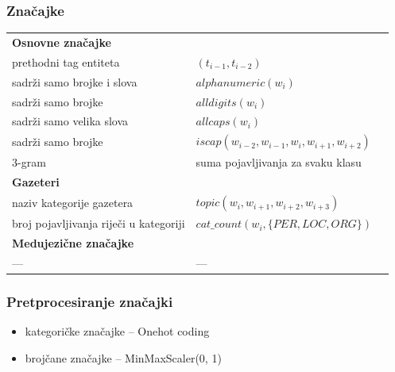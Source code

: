 \documentclass{beamer}
\begin{document}
\begin{frame}
\frametitle{Značajke}
\begin{center}
\begin{tabular}{llr}
\hline
\textbf{Osnovne značajke} & \\
prethodni tag entiteta & $ (t_{i-1},t_{i-2}) $\\ 
sadrži samo brojke i slova & $ alphanumeric(w_i) $\\ 
sadrži samo brojke  & $ alldigits(w_i) $\\ 
sadrži samo velika slova & $ allcaps(w_i) $\\ 
sadrži samo brojke & $ iscap(w_{i-2}, w_{i-1}, w_{i}, w_{i+1}, w_{i+2}) $\\
3-gram & suma pojavljivanja za svaku klasu \\
\textbf{Gazeteri} & \\
naziv kategorije gazetera  & $ topic(w_{i}, w_{i+1}, w_{i+2}, w_{i+3}) $\\
broj pojavljivanja riječi u kategoriji & $ cat\_count(w_{i}, \{PER, LOC, ORG\}) $\\
\textbf{Medujezične značajke} & \\
--- & ---\\

\hline
\end{tabular}
\end{center}
\end{frame}

\begin{frame}
\frametitle{Pretprocesiranje značajki}
\begin{itemize}
\item kategoričke značajke -- Onehot coding
\item brojčane značajke -- MinMaxScaler(0, 1)
\end{itemize}
\end{frame}
\end{document}
